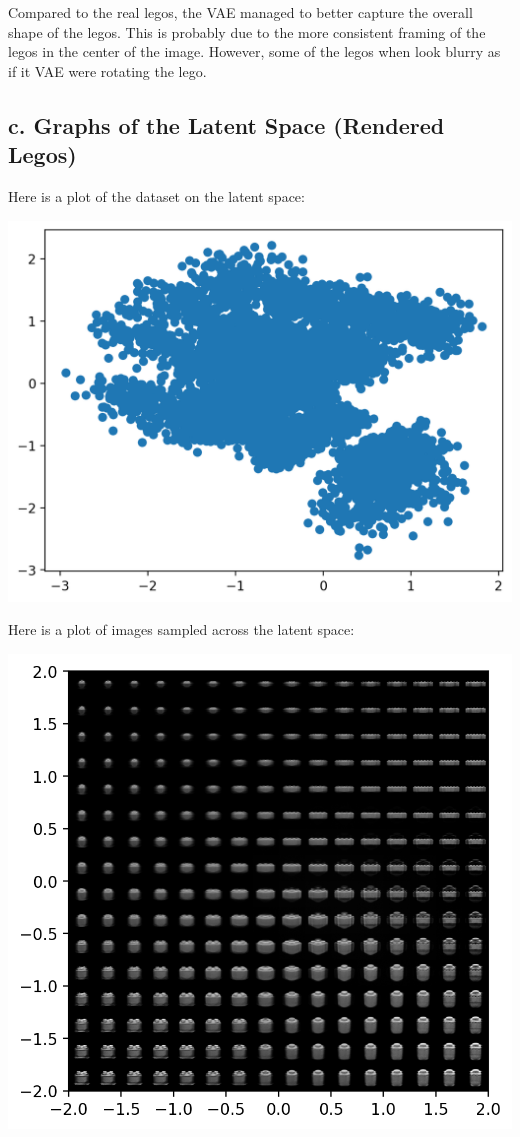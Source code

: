 \documentclass{article}
\begin{document}
Compared to the real legos, the VAE managed to better capture
the overall shape of the legos. 
This is probably due to the more consistent framing of the legos
in the center of the image.
However, some of the legos when
look blurry as if it VAE were rotating the lego.

\subsection*{c. Graphs of the Latent Space (Rendered Legos)}

Here is a plot of the dataset on the latent space:

\begin{center}
  \includegraphics[scale=0.75]{latent_space-lego-blender-4}
\end{center}

Here is a plot of images sampled across the latent space:

\begin{center}
  \includegraphics[scale=1]{latent_space_examples-lego-blender-4}
\end{center}
\end{document}
